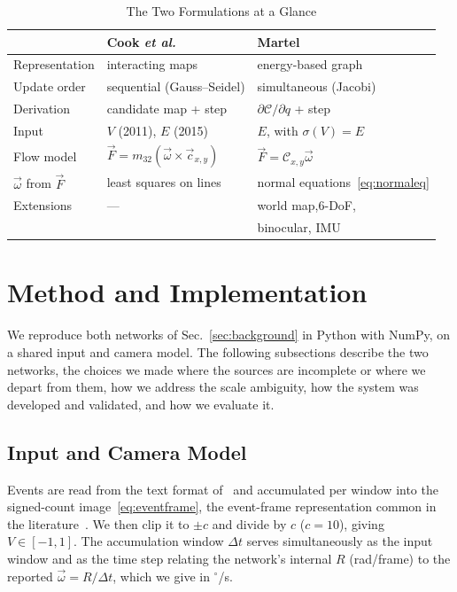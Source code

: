 \documentclass[journal]{IEEEtran}
\newcommand{\Vmap}{V}
\newcommand{\Fmap}{\vec{F}}
\newcommand{\Cmat}{\mathcal{C}}
\newcommand{\wvec}{\vec{\omega}}
\begin{document}
\begin{table}[!t]
\renewcommand{\arraystretch}{1.25}
\caption{The Two Formulations at a Glance}
\label{tab:variants}
\centering
\footnotesize
\begin{tabular}{@{}lll@{}}
\toprule
 & \textbf{Cook \emph{et al.}}~\cite{cook2011,martel2015relational} & \textbf{Martel}~\cite{martel2019thesis} \\
\midrule
Representation      & interacting maps          & energy-based graph \\
Update order & sequential (Gauss--Seidel)& simultaneous (Jacobi) \\
Derivation   & candidate map + step      & $\partial\mathcal{C}/\partial q$ + step \\
Input        & $\Vmap$ (2011), $E$ (2015)   & $E$, with $\sigma(\Vmap)=E$  \\
Flow model   & $\Fmap = m_{32}(\wvec\times \vec c_{x,y})$ & $\Fmap = \Cmat_{x,y}\wvec$ \\
$\wvec$ from $\Fmap$ & least squares on lines & normal equations~\eqref{eq:normaleq} \\
Extensions   & --- & world map,6-DoF,\\ & & binocular, IMU \\
\bottomrule
\end{tabular}
\end{table}

\section{Method and Implementation}
\label{sec:implementation}
We reproduce both networks of Sec.~\ref{sec:background} in Python with NumPy, on a shared input and camera model. The following subsections describe the two networks, the choices we made where the sources are incomplete or where we depart from them, how we address the scale ambiguity, how the system was developed and validated, and how we
evaluate it.

\subsection{Input and Camera Model}
\label{sec:input}
\label{sec:distortion}

Events are read from the text format of~\cite{mueggler2017} and accumulated per window into the signed-count image~\eqref{eq:eventframe}, the event-frame representation common in the literature~\cite{gallego2022survey}. We then clip it to $\pm c$ and divide by $c$ ($c = 10$), giving $\Vmap \in [-1,1]$. The accumulation window $\Delta t$ serves simultaneously as the input window and as the time step relating the network's internal $R$ (rad/frame) to the reported $\wvec = R/\Delta t$, which we give in $^\circ$/s.
\end{document}
